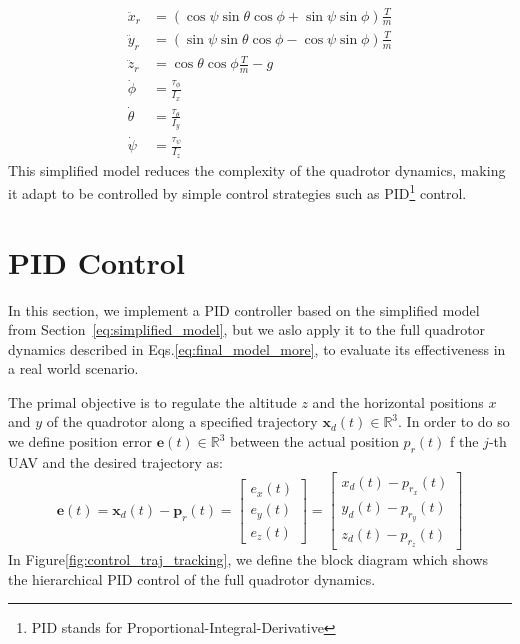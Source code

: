 \begin{subequations}
\begin{align}
    \ddot{x}_r &= (\cos\psi \sin\theta \cos\phi + \sin\psi \sin\phi) \frac{T}{m} \label{eq:position_control_x}\\[6pt] 
    \ddot{y}_r &= (\sin\psi \sin\theta \cos\phi - \cos\psi \sin\phi) \frac{T}{m} \label{eq:position_control_y}\\[6pt] 
    \ddot{z}_r &= \cos\theta \cos\phi \frac{T}{m} - g  \label{eq:position_control_z}\\[6pt] 
    \dot{\phi} &= \frac{\tau_{\phi}}{I_x} \\[8pt]
    \dot{\theta} &= \frac{\tau_{\theta}}{I_y} \\[8pt]
    \dot{\psi} &= \frac{\tau_{\psi}}{I_z}
\end{align}
\label{eq:simplified_model}
\end{subequations}
This simplified model reduces the complexity of the quadrotor dynamics,
making it adapt to be controlled by simple control strategies such as 
PID\footnote{PID stands for Proportional-Integral-Derivative} control.

\section{PID Control}
\label{sec:PID_control}
In this section, we implement a PID controller 
based on the simplified model from Section~\ref{eq:simplified_model},
but we aslo apply it to the full quadrotor dynamics described in Eqs.\ref{eq:final_model_more},
to evaluate its effectiveness in a real world scenario.

The primal objective is to regulate the altitude $z$ and the 
horizontal positions \( x \) and \( y \) of the quadrotor along a 
specified trajectory $\mathbf{x}_d(t) \in \mathbb{R}^3$.
In order to do so we define position error $\mathbf{e}(t) \in \mathbb{R}^3$
between the actual position $p_r(t)$ f the $j$-th UAV and the desired trajectory as:
\[
    \mathbf{e}(t) = \mathbf{x}_d(t) - \mathbf{p}_r(t) = 
    \begin{bmatrix}
        e_x(t) \\
        e_y(t) \\
        e_z(t)
    \end{bmatrix} =
    \begin{bmatrix}
        x_d(t) - p_{r_x}(t) \\
        y_d(t) - p_{r_y}(t) \\
        z_d(t) - p_{r_z}(t)
    \end{bmatrix}
\]
In Figure\ref{fig:control_traj_tracking}, we define the block
diagram which shows the hierarchical PID control of the full 
quadrotor dynamics.

